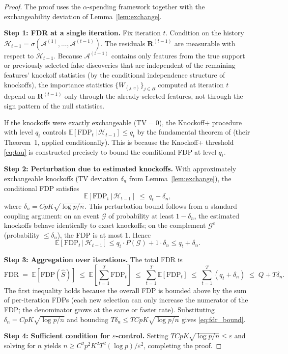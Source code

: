 \documentclass[11pt, a4paper]{article}
\newcommand{\E}{\mathbb{E}}
\newcommand{\calA}{\mathcal{A}}
\newcommand{\TV}{\mathrm{TV}}
\newcommand{\FDR}{\mathrm{FDR}}
\newcommand{\FDP}{\mathrm{FDP}}
\newcommand{\cond}{\,|\,}
\begin{document}
\begin{proof}
The proof uses the $\alpha$-spending framework together with the
exchangeability deviation of Lemma~\ref{lem:exchange}.

\medskip
\noindent\textbf{Step 1: FDR at a single iteration.}
Fix iteration $t$.  Condition on the history $\mathcal{H}_{t-1} =
\sigma(\calA^{(1)}, \ldots, \calA^{(t-1)})$.  The residuals
$\mathbf{R}^{(t-1)}$ are measurable with respect to $\mathcal{H}_{t-1}$.
Because $\calA^{(t-1)}$ contains only features from the true support or
previously selected false discoveries that are independent of the remaining
features' knockoff statistics (by the conditional independence structure of
knockoffs), the importance statistics $\{W_{(j,e)}\}_{j \in B}$ computed at
iteration $t$ depend on $\mathbf{R}^{(t-1)}$ only through the already-selected
features, not through the sign pattern of the null statistics.

If the knockoffs were exactly exchangeable ($\TV = 0$), the Knockoff+
procedure with level $q_t$ controls $\E[\FDP_t \cond \mathcal{H}_{t-1}] \leq q_t$
by the fundamental theorem of \cite{barber2015controlling} (their
Theorem~1, applied conditionally).  This is because the Knockoff+ threshold
\eqref{eq:tau} is constructed precisely to bound the conditional FDP at
level $q_t$.

\medskip
\noindent\textbf{Step 2: Perturbation due to estimated knockoffs.}
With approximately exchangeable knockoffs (TV deviation $\delta_n$ from
Lemma~\ref{lem:exchange}), the conditional FDP satisfies
\[
  \E[\FDP_t \cond \mathcal{H}_{t-1}]
  \;\leq\; q_t + \delta_n,
\]
where $\delta_n = C p K \sqrt{\log p / n}$.  This perturbation bound follows
from a standard coupling argument: on an event $\mathcal{G}$ of probability
at least $1 - \delta_n$, the estimated knockoffs behave identically to exact
knockoffs; on the complement $\mathcal{G}^c$ (probability $\leq \delta_n$),
the FDP is at most 1.  Hence
\[
  \E[\FDP_t \cond \mathcal{H}_{t-1}]
  \leq q_t \cdot P(\mathcal{G}) + 1 \cdot \delta_n
  \leq q_t + \delta_n.
\]

\medskip
\noindent\textbf{Step 3: Aggregation over iterations.}
The total FDR is
\[
  \FDR
  \;=\; \E[\FDP(\hat S)]
  \;\leq\; \E\!\left[\sum_{t=1}^T \FDP_t\right]
  \;\leq\; \sum_{t=1}^T \E[\FDP_t]
  \;\leq\; \sum_{t=1}^T (q_t + \delta_n)
  \;\leq\; Q + T\delta_n.
\]
The first inequality holds because the overall FDP is bounded above by the
sum of per-iteration FDPs (each new selection can only increase the
numerator of the FDP; the denominator grows at the same or faster rate).
Substituting $\delta_n = C p K \sqrt{\log p / n}$ and bounding
$T\delta_n \leq T C p K \sqrt{\log p / n}$ gives \eqref{eq:fdr_bound}.

\medskip
\noindent\textbf{Step 4: Sufficient condition for $\varepsilon$-control.}
Setting $T C p K \sqrt{\log p / n} \leq \varepsilon$ and solving for $n$
yields $n \geq C^2 p^2 K^2 T^2 (\log p) / \varepsilon^2$, completing the
proof.
\end{proof}
\end{document}
